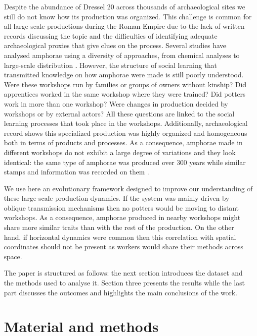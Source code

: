 \documentclass[review]{elsarticle}
\begin{document}
Despite the abundance of Dressel 20 across thousands of archaeological sites we still do not know how its production was organized. This challenge is common for all large-scale productions during the Roman Empire due to the lack of written records discussing the topic and the difficulties of identifying adequate archaeological proxies that give clues on the process. Several studies have analysed amphorae using a diversity of approaches, from chemical analyses to large-scale distribution \citep{isaksen_network_2006,brughmans_roman_2016,coto-sarmiento_maria_bayesian_????}. However, the structure of social learning that transmitted knowledge on how amphorae were made is still poorly understood. Were these workshops run by families or groups of owners without kinship? Did apprentices worked in the same workshop where they were trained? Did potters work in more than one workshop? Were changes in production decided by workshops or by external actors? All these questions are linked to the social learning processes that took place in the workshops. Additionally, archaeological record shows this specialized production was highly organized and homogeneous both in terms of products and processes. As a consequence, amphorae made in different workshops do not exhibit a large degree of variations and they look identical: the same type of amphorae was produced over 300 years while similar stamps and information was recorded on them \citep{remesal_anforas_2004}.

We use here an evolutionary framework designed to improve our understanding of these large-scale production dynamics. If the system was mainly driven by oblique transmission mechanisms then no potters would be moving to distant workshops. As a consequence, amphorae produced in nearby workshops might share more similar traits than with the rest of the production. On the other hand, if horizontal dynamics were common then this correlation with spatial coordinates should not be present as workers would share their methods across space.

The paper is structured as follows: the next section introduces the dataset and the methods used to analyse it. Section three presents the results while the last part discusses the outcomes and highlights the main conclusions of the work. 

\section{Material and methods}
\end{document}
